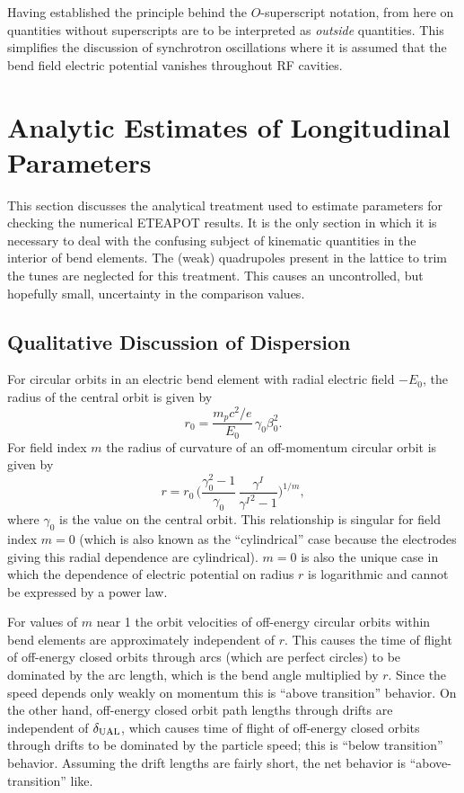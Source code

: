 \documentclass[]{article}
\begin{document}
Having established the principle behind the $O$-superscript notation,
from here on quantities without superscripts are to be interpreted
as \emph{outside} quantities. This simplifies the discussion of synchrotron
oscillations where it is assumed that the bend field 
electric potential vanishes throughout RF cavities.

\section{Analytic Estimates of Longitudinal Parameters}
This section discusses the analytical treatment used to estimate
parameters for checking the numerical ETEAPOT results. It is the
only section in which it is necessary to deal with the confusing
subject of kinematic quantities in the interior of bend elements.
The (weak) quadrupoles present in the lattice to trim the tunes are 
neglected for this treatment. This causes an uncontrolled, but 
hopefully small, uncertainty in the comparison values. 

\subsection{Qualitative Discussion of Dispersion}
For circular orbits in an electric bend element 
with radial electric field $-E_0$, the radius of 
the central orbit is given by
%
\begin{equation}
r_0 
 =
\frac{m_pc^2/e}{E_0}\,\gamma_0\beta_0^2.
\label{eq:Offset.5}
\end{equation}
%
For field index $m$ the radius of curvature of an off-momentum
circular orbit is given by
%
\begin{equation}
 r
 = 
r_0\,
\Big(
\frac{\gamma_0^2-1}{\gamma_0}\,
\frac{\gamma^I}{{\gamma^I}^2-1}
\Big)^{1/m},
\label{eq:Offset.6}
\end{equation}
%
where $\gamma_0$ is the value on the central orbit. This relationship
is singular for field index $m=0$ (which is also known as the 
``cylindrical'' case because the electrodes giving this radial
dependence are cylindrical). $m=0$ is
also the unique case in which the dependence of electric potential on
radius $r$ is logarithmic and cannot be expressed by a power law.

For values of $m$ near 1 the orbit velocities of off-energy circular 
orbits within bend elements are approximately independent of $r$.
This causes the time of flight of off-energy
closed orbits through arcs (which are perfect circles) 
to be dominated by the arc length, which
is the bend angle multiplied by $r$. Since the speed depends only
weakly on momentum this is ``above transition'' behavior.
On the other hand, off-energy closed orbit path lengths through drifts 
are independent of $\delta_{\rm UAL}$, which causes time of flight of 
off-energy closed orbits through drifts to be dominated by the 
particle speed; this is ``below transition'' behavior. Assuming
the drift lengths are fairly short, the net behavior is 
``above-transition'' like.
\end{document}

